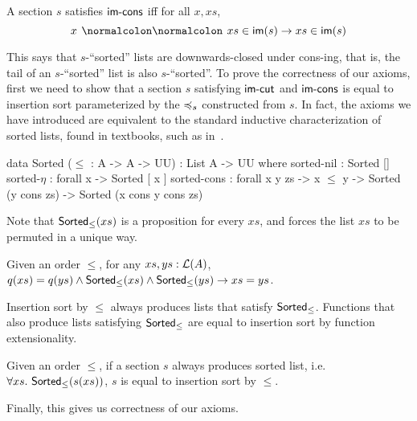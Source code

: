 \begin{definition}[$\istailsort$]
    \label{def:tail-sort}
    A section $s$ satisfies $\istailsort$ iff
    for all $x, xs$,
    \[
        \inimage{x \cons xs} \to \inimage{xs}
    \]
\end{definition}

This says that $s$-``sorted'' lists are downwards-closed under cons-ing, that is,
the tail of an $s$-``sorted'' list is also $s$-``sorted''.
%
To prove the correctness of our axioms,
first we need to show that a section $s$ satisfying
$\operatorname{\mathsf{im-cut}}$ and $\istailsort$ is equal to insertion sort parameterized by
the $\preccurlyeq_{s}$ constructed from $s$.
%
In fact, the axioms we have introduced are equivalent to the standard inductive characterization of sorted lists,
found in textbooks, such as in~\cite{appelVerifiedFunctionalAlgorithms2023}.

\begin{code}
data Sorted ($\leq$ : A -> A -> UU) : List A -> UU where
  sorted-nil : Sorted []
  sorted-$\eta$ : forall x -> Sorted [ x ]
  sorted-cons : forall x y zs -> x $\leq$ y
     -> Sorted (y cons zs) -> Sorted (x cons y cons zs)
\end{code}
Note that $\operatorname{\mathsf{Sorted}}_{\leq}(xs)$ is a proposition for every $xs$,
and forces the list $xs$ to be permuted in a unique way.
\begin{lemma}
    Given an order $\leq$, for any $xs, ys : \mathcal{L}(A)$,
    $q(xs) = q(ys) \land \operatorname{\mathsf{Sorted}}_{\leq}(xs) \land \operatorname{\mathsf{Sorted}}_{\leq}(ys) \to xs = ys$.
\end{lemma}

Insertion sort by $\leq$ always produces lists that satisfy $\operatorname{\mathsf{Sorted}}_{\leq}$.
Functions that also produce lists satisfying $\operatorname{\mathsf{Sorted}}_{\leq}$ are equal to insertion sort
by function extensionality.

\begin{proposition}\label{sort:sort-uniq}
    Given an order $\leq$,
    if a section $s$ always produces sorted list, i.e. $\forall xs.\,\operatorname{\mathsf{Sorted}}_{\leq}(s(xs))$,
    $s$ is equal to insertion sort by $\leq$.
\end{proposition}
\noindent
Finally, this gives us correctness of our axioms.


